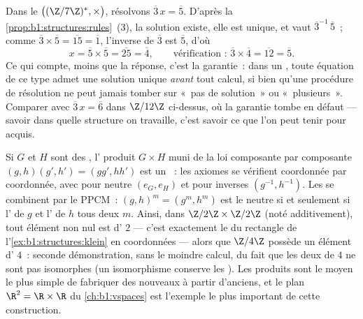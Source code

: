 \begin{example}\label{ex:b1:structures:solving}
Dans le  $\bigl((\Z/7\Z)^*, \times\bigr)$, résolvons $\overline
3\,x = \overline 5$. D'après la \cref{prop:b1:structures:rules}~(3), la
solution existe, elle est unique, et vaut $\overline3^{-1}\,
\overline5$~; comme $\overline3 \times \overline5 = \overline{15}
= \overline1$, l'inverse de $\overline 3$ est $\overline 5$, d'où
\[
x = \overline5 \times \overline5 = \overline{25} = \overline4,
\qquad\text{vérification~: } \overline3 \times \overline4 =
\overline{12} = \overline5 .
\]
Ce qui compte, moins que la réponse, c'est la garantie~: dans un
, toute équation de ce type admet une solution unique
\emph{avant} tout calcul, si bien qu'une procédure de résolution ne
peut jamais tomber sur «~pas de solution~» ou «~plusieurs~».
Comparer avec $\overline3\,x = \overline6$ dans $\Z/12\Z$ ci-dessus,
où la garantie tombe en défaut --- savoir dans quelle structure on
travaille, c'est savoir ce que l'on peut tenir pour acquis.
\end{example}

\begin{example}\label{ex:b1:structures:product}
Si $G$ et $H$ sont des , l' produit $G \times H$ muni
de la loi composante par composante $(g, h)(g', h') = (gg', hh')$ est
un ~: les axiomes se vérifient coordonnée par coordonnée, avec
pour neutre $(e_G, e_H)$ et pour inverses $(g^{-1}, h^{-1})$. Les
 se combinent par le PPCM~: $(g, h)^m = (g^m, h^m)$ est le
neutre si et seulement si l' de $g$ et l' de $h$ 
tous deux $m$. Ainsi, dans $\Z/2\Z \times \Z/2\Z$ (noté additivement),
tout élément non nul est d' $2$ --- c'est exactement le  du
rectangle de l'\cref{ex:b1:structures:klein} en coordonnées --- alors
que $\Z/4\Z$ possède un élément d' $4$~: seconde démonstration,
sans le moindre calcul, du fait que les deux  de  $4$
ne sont pas isomorphes (un isomorphisme conserve les ). Les
produits sont le moyen le plus simple de fabriquer des 
nouveaux à partir d'anciens, et le plan $\R^2 = \R \times \R$ du
\cref{ch:b1:vspaces} est l'exemple le plus important de cette
construction.
\end{example}

